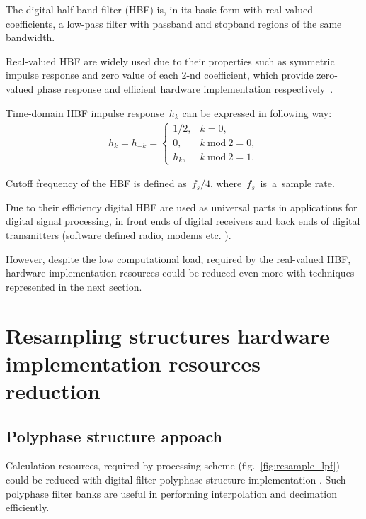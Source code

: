 \documentclass[conference]{IEEEtran}
\begin{document}
	The digital half-band filter (HBF) is, in its basic form with real-valued coefficients, a low-pass filter with passband and stopband regions of the same bandwidth.
	
	Real-valued HBF are widely used due to their properties such as symmetric impulse response and zero value of each 2-nd coefficient, which provide zero-valued phase response and efficient hardware implementation respectively~\cite{ch12_gockler}.
	
	Time-domain HBF impulse response~$h_k$ can be expressed in following way:
	\begin{gather*}
		h_k = h_{-k} =
		\begin{cases}
			1/2, & k=0, \\
			0, & k \ \text{mod} \ 2 =0, \\
			h_k, & k \ \text{mod} \ 2 =1.
		\end{cases}
	\end{gather*}
	
	Cutoff frequency of the HBF is defined as~$f_s/4$, where~$f_s$~is~a~sample rate.
	
	Due to their efficiency digital HBF are used as universal parts in applications for digital signal processing, in front ends of digital receivers and back ends of digital transmitters (software defined radio, modems etc. \cite{ren_multi_band}).
	
	However, despite the low computational load, required by the real-valued HBF, hardware implementation resources could be reduced even more with techniques represented in the next section. 
	
	\section{Resampling structures hardware implementation resources reduction}
	
	\subsection{Polyphase structure appoach}
	Calculation resources, required by processing scheme (fig.~\ref{fig:resample_lpf}) could be reduced with digital filter polyphase structure implementation \cite{vaidyanathan}.
	Such polyphase filter banks are useful in performing interpolation and decimation efficiently. 
	
\end{document}
